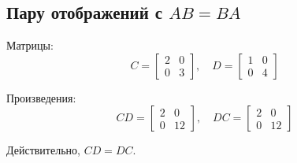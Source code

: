 \subsection*{Пару отображений с $AB = BA$}

Матрицы:
\begin{equation}
C = \begin{bmatrix} 2 & 0 \\ 0 & 3 \end{bmatrix}, \quad
D = \begin{bmatrix} 1 & 0 \\ 0 & 4 \end{bmatrix}
\end{equation}

Произведения:
\begin{equation}
CD = \begin{bmatrix} 2 & 0 \\ 0 & 12 \end{bmatrix}, \quad
DC = \begin{bmatrix} 2 & 0 \\ 0 & 12 \end{bmatrix}
\end{equation}

Действительно, $CD = DC$.

